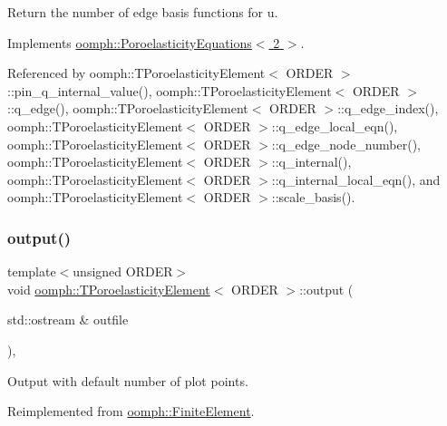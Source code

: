 Return the number of edge basis functions for u. 



Implements \hyperlink{classoomph_1_1PoroelasticityEquations_a81b78261be29e506dc70a59c2925c061}{oomph\+::\+Poroelasticity\+Equations$<$ 2 $>$}.



Referenced by oomph\+::\+T\+Poroelasticity\+Element$<$ O\+R\+D\+E\+R $>$\+::pin\+\_\+q\+\_\+internal\+\_\+value(), oomph\+::\+T\+Poroelasticity\+Element$<$ O\+R\+D\+E\+R $>$\+::q\+\_\+edge(), oomph\+::\+T\+Poroelasticity\+Element$<$ O\+R\+D\+E\+R $>$\+::q\+\_\+edge\+\_\+index(), oomph\+::\+T\+Poroelasticity\+Element$<$ O\+R\+D\+E\+R $>$\+::q\+\_\+edge\+\_\+local\+\_\+eqn(), oomph\+::\+T\+Poroelasticity\+Element$<$ O\+R\+D\+E\+R $>$\+::q\+\_\+edge\+\_\+node\+\_\+number(), oomph\+::\+T\+Poroelasticity\+Element$<$ O\+R\+D\+E\+R $>$\+::q\+\_\+internal(), oomph\+::\+T\+Poroelasticity\+Element$<$ O\+R\+D\+E\+R $>$\+::q\+\_\+internal\+\_\+local\+\_\+eqn(), and oomph\+::\+T\+Poroelasticity\+Element$<$ O\+R\+D\+E\+R $>$\+::scale\+\_\+basis().

\mbox{\label{classoomph_1_1TPoroelasticityElement_a3912efeb340ac4391ace351b4fe616c3}} 
\subsubsection{\texorpdfstring{output()}{output()}\hspace{0.1cm}{\footnotesize\ttfamily [1/2]}}
{\footnotesize\ttfamily template$<$unsigned O\+R\+D\+ER$>$ \\
void \hyperlink{classoomph_1_1TPoroelasticityElement}{oomph\+::\+T\+Poroelasticity\+Element}$<$ O\+R\+D\+ER $>$\+::output (\begin{DoxyParamCaption}\item[{std\+::ostream \&}]{outfile }\end{DoxyParamCaption})\hspace{0.3cm}{\ttfamily [inline]}, {\ttfamily [virtual]}}



Output with default number of plot points. 



Reimplemented from \hyperlink{classoomph_1_1FiniteElement_a2ad98a3d2ef4999f1bef62c0ff13f2a7}{oomph\+::\+Finite\+Element}.



